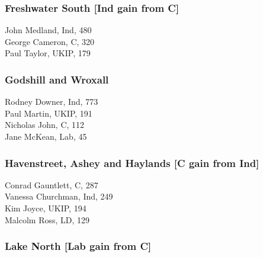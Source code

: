 \documentclass[a4paper,openany,10pt]{book}
\begin{document}
\subsubsection*{Freshwater South \hspace*{\fill}\nolinebreak[1]%
\enspace\hspace*{\fill}
[Ind gain from C]}



John Medland, Ind, 480\\
George Cameron, C, 320\\
Paul Taylor, UKIP, 179\\


\subsubsection*{Godshill and Wroxall}



Rodney Downer, Ind, 773\\
Paul Martin, UKIP, 191\\
Nicholas John, C, 112\\
Jane McKean, Lab, 45\\


\subsubsection*{Havenstreet, Ashey and Haylands \hspace*{\fill}\nolinebreak[1]%
\enspace\hspace*{\fill}
[C gain from Ind]}



Conrad Gauntlett, C, 287\\
Vanessa Churchman, Ind, 249\\
Kim Joyce, UKIP, 194\\
Malcolm Ross, LD, 129\\


\subsubsection*{Lake North \hspace*{\fill}\nolinebreak[1]%
\enspace\hspace*{\fill}
[Lab gain from C]}
\end{document}

